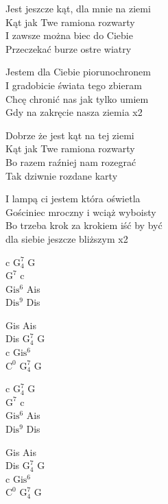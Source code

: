\begin{text}
    Jest jeszcze kąt, dla mnie na ziemi\\
    Kąt jak Twe ramiona rozwarty\\
    I zawsze można biec do Ciebie\\
    Przeczekać burze ostre wiatry

    \vin Jestem dla Ciebie piorunochronem\\
    \vin I gradobicie świata tego zbieram\\
    \vin Chcę chronić nas jak tylko umiem\\
    \vin Gdy na zakręcie nasza ziemia x2

    Dobrze że jest kąt na tej ziemi\\
    Kąt jak Twe ramiona rozwarty\\
    Bo razem raźniej nam rozegrać\\
    Tak dziwnie rozdane karty

    \vin I lampą ci jestem która oświetla\\
    \vin Gościniec mroczny i wciąż wyboisty\\
    \vin Bo trzeba krok za krokiem iść by być\\
    \vin dla siebie jeszcze bliższym x2
\end{text}
\begin{chord}
    c $\mathrm{G_{4}^{7}}$ G\\
    $\mathrm{G^{7}}$ c\\
    $\mathrm{Gis^{6}}$ Ais\\
    $\mathrm{Dis^{9}}$ Dis

    Gis Ais\\
    Dis $\mathrm{G_{4}^{7}}$ G\\
    c $\mathrm{Gis^{6}}$\\
    $\mathrm{C^{0}}$ $\mathrm{G_{4}^{7}}$ G

    c $\mathrm{G_{4}^{7}}$ G\\
    $\mathrm{G^{7}}$ c\\
    $\mathrm{Gis^{6}}$ Ais\\
    $\mathrm{Dis^{9}}$ Dis

    Gis Ais\\
    Dis $\mathrm{G_{4}^{7}}$ G\\
    c $\mathrm{Gis^{6}}$\\
    $\mathrm{C^{0}}$ $\mathrm{G_{4}^{7}}$ G
\end{chord}
